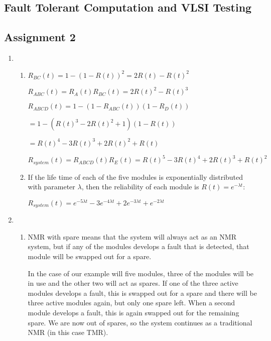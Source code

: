 \documentclass[a4paper,12pt]{article}
\begin{document}
    \begin{center}
        \section*{Fault Tolerant Computation and VLSI Testing}
        \subsection*{Assignment 2}
    \end{center}

    \begin{enumerate}

        \item
            \begin{enumerate}
                \item $R_{BC}(t) = 1 - (1 - R(t))^2 = 2R(t) - R(t)^2$

                    $R_{ABC}(t) = R_A(t)R_{BC}(t) = 2R(t)^2 - R(t)^3$

                    $R_{ABCD}(t) = 1 - (1 - R_{ABC}(t))(1 - R_D(t))$

                    $= 1 - (R(t)^3 - 2R(t)^2 + 1)(1 - R(t))$

                    $= R(t)^4 - 3R(t)^3 + 2R(t)^2 + R(t)$

                    $R_{system}(t) = R_{ABCD}(t)R_E(t) = R(t)^5 - 3R(t)^4 + 2R(t)^3 + R(t)^2$

                \item If the life time of each of the five modules is exponentially distributed with parameter $\lambda$, then the reliability of each module is $R(t) = e^{-\lambda t}$:

                    $R_{system}(t) = e^{-5\lambda t} - 3e^{-4\lambda t} + 2e^{-3\lambda t} + e^{-2\lambda t}$
            \end{enumerate}

        \item 
            \begin{enumerate}
                \item NMR with spare means that the system will always act as an NMR system, but if any of the modules develops a fault that is detected, that module will be swapped out for a spare.

                    In the case of our example will five modules, three of the modules will be in use and the other two will act as spares. If one of the three active modules develops a fault, this is swapped out for a spare and there will be three active modules again, but only one spare left. When a second module develops a fault, this is again swapped out for the remaining spare. We are now out of spares, so the system continues as a traditional NMR (in this case TMR).


\end{enumerate}
\end{enumerate}
\end{document}
